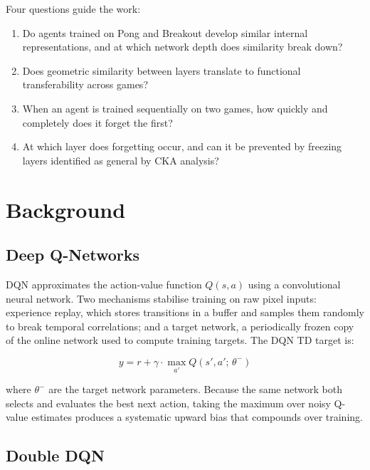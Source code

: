 \documentclass[a4paper]{article}
\begin{document}
Four questions guide the work:

\begin{enumerate}
    \item Do agents trained on Pong and Breakout develop similar internal representations, and at which network depth does similarity break down?
    \item Does geometric similarity between layers translate to functional transferability across games?
    \item When an agent is trained sequentially on two games, how quickly and completely does it forget the first?
    \item At which layer does forgetting occur, and can it be prevented by freezing layers identified as general by CKA analysis?
\end{enumerate}

\section{Background}
\label{sec:background}

\subsection{Deep Q-Networks}

DQN \cite{mnih2015human} approximates the action-value function $Q(s, a)$ using a convolutional neural network. Two mechanisms stabilise training on raw pixel inputs: experience replay, which stores transitions in a buffer and samples them randomly to break temporal correlations; and a target network, a periodically frozen copy of the online network used to compute training targets. The DQN TD target is:

\begin{equation}
    y = r + \gamma \cdot \max_{a'} Q(s', a';\, \theta^{-})
\end{equation}

where $\theta^{-}$ are the target network parameters. Because the same network both selects and evaluates the best next action, taking the maximum over noisy Q-value estimates produces a systematic upward bias that compounds over training.

\subsection{Double DQN}
\end{document}
